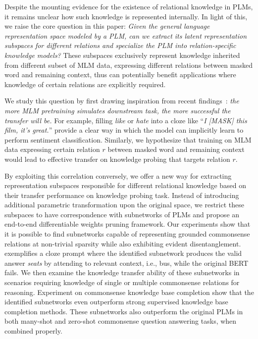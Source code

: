 Despite the mounting evidence for the existence of relational knowledge in PLMs, it remains unclear how such knowledge is represented internally. In light of this, we raise the core question in this paper:
\textit{Given the general language representation space modeled by a PLM, can we extract its latent representation subspaces for different relations and specialize the PLM into relation-specific knowledge models?} These subspaces exclusively represent knowledge inherited from different subset of MLM data, expressing different relations between 
masked word and remaining context, thus can potentially benefit applications where knowledge of certain 
relations are explicitly required.


We study this question by first drawing inspiration from recent findings~\citep{DBLP:journals/corr/abs-2010-03648,DBLP:journals/corr/abs-2008-01064,inductivemlm}: \textit{the more  MLM pretraining simulates downstream task, the more successful the  transfer will be.} For example, filling \textit{like} or \textit{hate} into a cloze like ``\textit{I [MASK] this film, it's great.}'' provide a clear way in which the model can implicitly learn to perform sentiment classification. Similarly, we hypothesize that training on MLM data expressing certain relation $r$ between masked word and remaining context would lead to effective transfer on knowledge probing that targets relation $r$. 

By exploiting this correlation conversely, we offer a new way for extracting representation subspaces responsible for different relational knowledge based on their transfer performance on knowledge probing task. Instead of introducing additional parametric transformation upon the original space, we restrict these subspaces to have correspondence with subnetworks of PLMs and propose an end-to-end differentiable weights pruning framework.
Our experiments show that it is possible to find subnetworks capable of representing grounded commonsense relations at non-trivial sparsity while also exhibiting evident disentanglement.  exemplifies a cloze prompt where the identified subnetwork produces the valid answer \textit{seats} by attending to relevant 
context, i.e., bus,  while the original \textsc{BERT} fails. We then examine the knowledge transfer ability of these subnetworks in scenarios requiring knowledge of single or multiple commonsense relations for reasoning. Experiment on commonsense knowledge base completion show that the identified subnetworks even outperform strong supervised knowledge base completion methods. These subnetworks also outperform the original PLMs in both many-shot and zero-shot commonsense question answering tasks, when combined properly.

